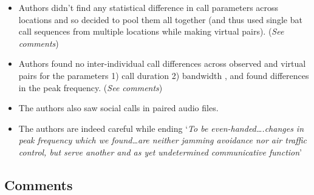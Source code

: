 \documentclass[
]{book}
\providecommand{\tightlist}{%
  \setlength{\itemsep}{0pt}\setlength{\parskip}{0pt}}
\begin{document}
\begin{itemize}
\tightlist
\item
  Authors didn't find any statistical difference in call parameters across locations and so decided to pool them all together (and thus used single bat call sequences from multiple locations while making virtual pairs). (\emph{See comments})
\item
  Authors found no inter-individual call differences across observed and virtual pairs for the parameters 1) call duration 2) bandwidth , and found differences in the peak frequency. (\emph{See comments})
\item
  The authors also saw social calls in paired audio files.
\item
  The authors are indeed careful while ending `\emph{To be even-handed\ldots.changes in peak frequency which we found\ldots are neither jamming avoidance nor air traffic control, but serve another and as yet undetermined communicative function}'
\end{itemize}

\hypertarget{comments-2}{%
\subsection{Comments}\label{comments-2}}
\end{document}
